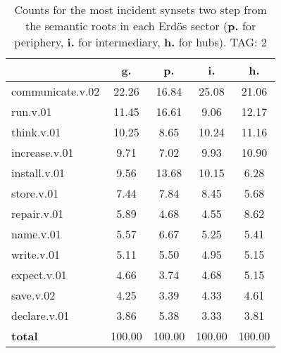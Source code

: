 \begin{table}[h!]
\begin{center}
\begin{tabular}{| l | c | c | c | c |}\hline
 & g. & p. & i. & h. \\\hline
communicate.v.02 & 22.26  & 16.84  & 25.08  & 21.06 \\\hline
run.v.01 & 11.45  & 16.61  & 9.06  & 12.17 \\\hline
think.v.01 & 10.25  & 8.65  & 10.24  & 11.16 \\\hline
increase.v.01 & 9.71  & 7.02  & 9.93  & 10.90 \\\hline
install.v.01 & 9.56  & 13.68  & 10.15  & 6.28 \\\hline
store.v.01 & 7.44  & 7.84  & 8.45  & 5.68 \\\hline
repair.v.01 & 5.89  & 4.68  & 4.55  & 8.62 \\\hline
name.v.01 & 5.57  & 6.67  & 5.25  & 5.41 \\\hline
write.v.01 & 5.11  & 5.50  & 4.95  & 5.15 \\\hline
expect.v.01 & 4.66  & 3.74  & 4.68  & 5.15 \\\hline
save.v.02 & 4.25  & 3.39  & 4.33  & 4.61 \\\hline
declare.v.01 & 3.86  & 5.38  & 3.33  & 3.81 \\\hline
{{\bf total}} & 100.00  & 100.00  & 100.00  & 100.00 \\\hline
\end{tabular}
\caption{Counts for the most incident synsets two step from the semantic roots in each Erd\"os sector ({\bf p.} for periphery, {\bf i.} for intermediary, {\bf h.} for hubs). TAG: 2}
\end{center}
\end{table}